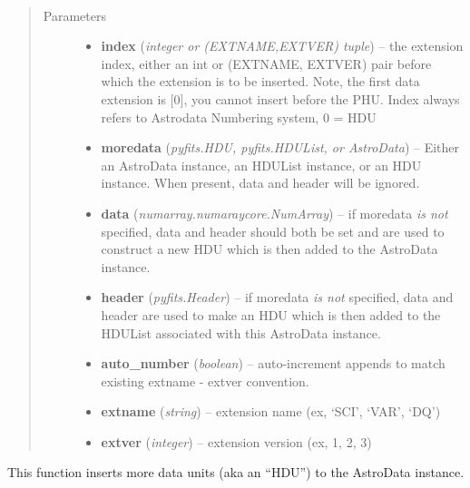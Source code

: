 \documentclass[letterpaper,10pt,english]{sphinxmanual}
\begin{document}
\begin{fulllineitems}
\label{chapter_AstroDataClass:astrodata.data.AstroData.insert}~\begin{quote}\begin{description}
\item[{Parameters}] \leavevmode\begin{itemize}
\item {} 
\textbf{index} (\emph{integer or (EXTNAME,EXTVER) tuple}) -- the extension index, either an int or (EXTNAME, EXTVER)
pair before which the extension is to be inserted. Note, the 
first data extension is {[}0{]}, you cannot insert before the PHU.
Index always refers to Astrodata Numbering system, 0 = HDU

\item {} 
\textbf{moredata} (\emph{pyfits.HDU, pyfits.HDUList, or AstroData}) -- Either an AstroData instance, an HDUList instance, or
an HDU instance. When present, data and header will be ignored.

\item {} 
\textbf{data} (\emph{numarray.numaraycore.NumArray}) -- if moredata \emph{is not} specified, data and header should 
both be set and are used to construct a new HDU which is then 
added to the AstroData instance.

\item {} 
\textbf{header} (\emph{pyfits.Header}) -- if moredata \emph{is not} specified, data and header are 
used to make an HDU which is then added to the HDUList associated
with this AstroData instance.

\item {} 
\textbf{auto\_number} (\emph{boolean}) -- auto-increment appends to match existing extname - extver 
convention.

\item {} 
\textbf{extname} (\emph{string}) -- extension name (ex, `SCI', `VAR', `DQ')

\item {} 
\textbf{extver} (\emph{integer}) -- extension version (ex, 1, 2, 3)

\end{itemize}

\end{description}\end{quote}

This function inserts more data units (aka an ``HDU'') to the AstroData
instance.

\end{fulllineitems}
\end{document}
